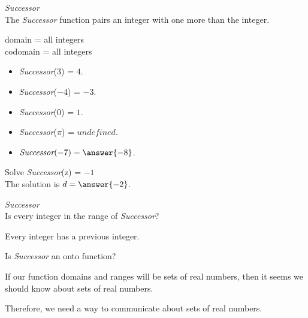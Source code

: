\documentclass{ximera}
\begin{document}
\begin{question} \textit{Successor} \\
The \textit{Successor} function pairs an integer with one more than the integer.

domain = all integers  \\ 
codomain = all integers


\begin{itemize}
\item \textit{Successor}($3$) = $4$.
\item \textit{Successor}($-4$) = $-3$.
\item \textit{Successor}($0$) = $1$.
\item \textit{Successor}($\pi$) = $undefined$.

\item $\textit{Successor}(-7) = \answer{-8}$.
\end{itemize}


Solve \textit{Successor}(z) = $-1$ \\

The solution is $d = \answer{-2}$.

\end{question} 







\begin{question} \textit{Successor} \\
Is every integer in the range of \textit{Successor}?


\begin{multipleChoice}
\end{multipleChoice}
\begin{feedback}
Every integer has a previous integer.  
\end{feedback}


Is \textit{Successor} an onto function?
\begin{multipleChoice}
\end{multipleChoice}


\end{question} 











If our function domains and ranges will be sets of real numbers, then it seems we should know about sets of real numbers.

Therefore, we need a way to communicate about sets of real numbers.
\end{document}
